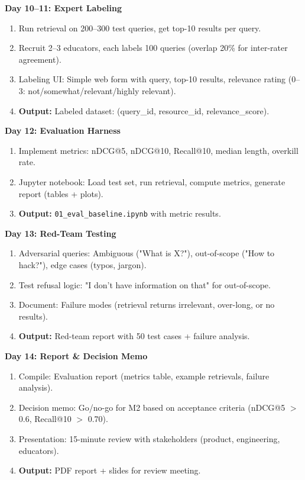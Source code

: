 \documentclass[11pt,letterpaper]{article}
\begin{document}
\textbf{Day 10--11: Expert Labeling}
\begin{enumerate}
\item Run retrieval on 200--300 test queries, get top-10 results per query.
\item Recruit 2--3 educators, each labels 100 queries (overlap 20\% for inter-rater agreement).
\item Labeling UI: Simple web form with query, top-10 results, relevance rating (0--3: not/somewhat/relevant/highly relevant).
\item \textbf{Output:} Labeled dataset: (query\_id, resource\_id, relevance\_score).
\end{enumerate}

\textbf{Day 12: Evaluation Harness}
\begin{enumerate}
\item Implement metrics: nDCG@5, nDCG@10, Recall@10, median length, overkill rate.
\item Jupyter notebook: Load test set, run retrieval, compute metrics, generate report (tables + plots).
\item \textbf{Output:} \texttt{01\_eval\_baseline.ipynb} with metric results.
\end{enumerate}

\textbf{Day 13: Red-Team Testing}
\begin{enumerate}
\item Adversarial queries: Ambiguous ("What is X?"), out-of-scope ("How to hack?"), edge cases (typos, jargon).
\item Test refusal logic: "I don't have information on that" for out-of-scope.
\item Document: Failure modes (retrieval returns irrelevant, over-long, or no results).
\item \textbf{Output:} Red-team report with 50 test cases + failure analysis.
\end{enumerate}

\textbf{Day 14: Report \& Decision Memo}
\begin{enumerate}
\item Compile: Evaluation report (metrics table, example retrievals, failure analysis).
\item Decision memo: Go/no-go for M2 based on acceptance criteria (nDCG@5 $>$ 0.6, Recall@10 $>$ 0.70).
\item Presentation: 15-minute review with stakeholders (product, engineering, educators).
\item \textbf{Output:} PDF report + slides for review meeting.
\end{enumerate}
\end{document}
